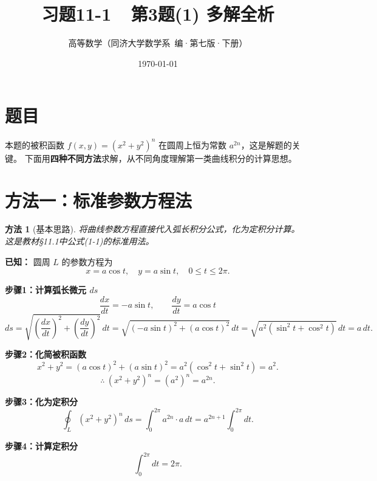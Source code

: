 \documentclass[12pt,a4paper]{ctexart}
\title{\Huge\bfseries 习题11-1~~第3题(1) 多解全析}
\author{高等数学（同济大学数学系~编·第七版·下册）}
\date{\today}
\theoremstyle{myremark}
\newtheorem*{method}{方法}
\newcommand{\answerbox}[1]{%
  \begin{center}
  \fbox{\color{red}\large\bfseries #1}
  \end{center}
}
\begin{document}
\maketitle
\thispagestyle{fancy}

\section*{题目}
\bigskip

本题的被积函数 $f(x,y)=(x^2+y^2)^n$ 在圆周上恒为常数 $a^{2n}$，这是解题的关键。
下面用\textbf{四种不同方法}求解，从不同角度理解第一类曲线积分的计算思想。

\section*{\textcolor{blue!70!black}{方法一：标准参数方程法}}

\begin{method}[基本思路]
  将曲线参数方程直接代入弧长积分公式，化为定积分计算。
  这是教材\S11.1中公式(1-1)的标准用法。
\end{method}

\medskip
\textbf{已知：} 圆周 $L$ 的参数方程为
\[
x = a\cos t,\quad y = a\sin t,\quad 0 \leq t \leq 2\pi.
\]

\noindent\textbf{步骤1：计算弧长微元 $ds$}
\[
\frac{dx}{dt} = -a\sin t,\qquad \frac{dy}{dt} = a\cos t
\]
\[
ds = \sqrt{\left(\frac{dx}{dt}\right)^2 + \left(\frac{dy}{dt}\right)^2}\, dt
     = \sqrt{(-a\sin t)^2 + (a\cos t)^2}\, dt
     = \sqrt{a^2(\sin^2 t + \cos^2 t)}\, dt
     = a\, dt.
\]

\noindent\textbf{步骤2：化简被积函数}
\[
x^2 + y^2 = (a\cos t)^2 + (a\sin t)^2 = a^2(\cos^2 t + \sin^2 t) = a^2.
\]
\[
\therefore\ (x^2 + y^2)^n = (a^2)^n = a^{2n}.
\]

\noindent\textbf{步骤3：化为定积分}
\[
\oint_L (x^2 + y^2)^n \, ds
   = \int_0^{2\pi} a^{2n} \cdot a \, dt
   = a^{2n+1} \int_0^{2\pi} dt.
\]

\noindent\textbf{步骤4：计算定积分}
\[
\int_0^{2\pi} dt = 2\pi.
\]

\answerbox{$\displaystyle \oint_L (x^2 + y^2)^n \, ds = 2\pi a^{2n+1}$}

\bigskip
\end{document}
